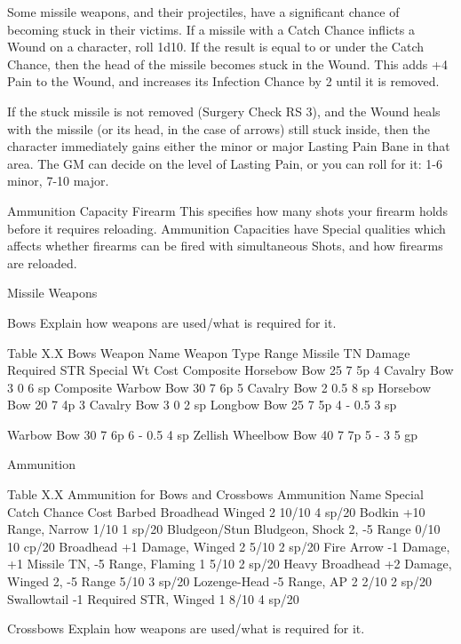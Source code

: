 \documentclass[oneside,11pt,english]{book}
\begin{document}
 

Some missile weapons, and their projectiles, have a significant chance of becoming stuck in their victims. 
If a missile with a Catch Chance inflicts a Wound on a character, roll 1d10. If the result is equal to or 
under the Catch Chance, then the head of the missile becomes stuck in the Wound. This adds +4 Pain to 
the Wound, and increases its Infection Chance by 2 until it is removed. 

 

If the stuck missile is not removed (Surgery Check RS 3), and the Wound heals with the missile (or its 
head, in the case of arrows) still stuck inside, then the character immediately gains either the minor or 
major Lasting Pain Bane in that area. The GM can decide on the level of Lasting Pain, or you can roll for 
it: 1-6 minor, 7-10 major. 

 

Ammunition Capacity 
Firearm 
This specifies how many shots your firearm holds before it requires reloading. Ammunition Capacities 
have Special qualities which affects whether firearms can be fired with simultaneous Shots, and how 
firearms are reloaded. 

 

Missile Weapons 

 

Bows 
Explain how weapons are used/what is required for it. 

 
Table X.X Bows 
Weapon Name Weapon Type Range Missile TN Damage Required STR Special Wt Cost 
Composite Horsebow Bow 25 7 5p 4 Cavalry Bow 3 0 6 sp 
Composite Warbow Bow 30 7 6p 5 Cavalry Bow 2 0.5 8 sp 
Horsebow Bow 20 7 4p 3 Cavalry Bow 3 0 2 sp 
Longbow Bow 25 7 5p 4 - 0.5 3 sp 


Warbow Bow 30 7 6p 6 - 0.5 4 sp 
Zellish Wheelbow Bow 40 7 7p 5 - 3 5 gp 

 
Ammunition 

 
Table X.X Ammunition for Bows and Crossbows 
Ammunition Name Special Catch Chance Cost 
Barbed Broadhead Winged 2 10/10 4 sp/20 
Bodkin +10 Range, Narrow 1/10 1 sp/20 
Bludgeon/Stun Bludgeon, Shock 2, -5 Range 0/10 10 cp/20 
Broadhead +1 Damage, Winged 2 5/10 2 sp/20 
Fire Arrow -1 Damage, +1 Missile TN, -5 Range, Flaming 1 5/10 2 sp/20 
Heavy Broadhead +2 Damage, Winged 2, -5 Range 5/10 3 sp/20 
Lozenge-Head -5 Range, AP 2 2/10 2 sp/20 
Swallowtail -1 Required STR, Winged 1 8/10 4 sp/20 

 

Crossbows 
Explain how weapons are used/what is required for it. 
\end{document}
